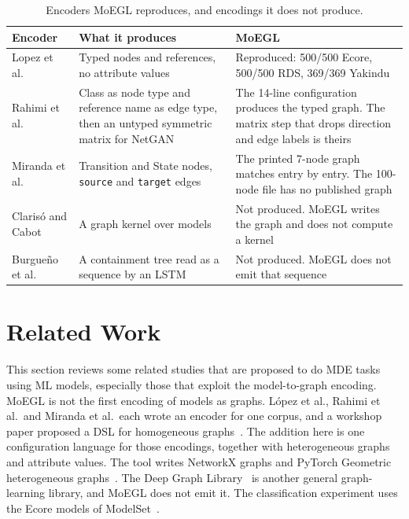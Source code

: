 \documentclass[journal,article,submit,moreauthors,technologies]{Definitions/mdpi}
\newcommand{\rev}[1]{#1}
\begin{document}
\begin{table}[H]
\caption{\rev{Encoders MoEGL reproduces, and encodings it does not produce.}\label{tab:coverage}}
\centering
\small
\begin{tabularx}{\textwidth}{lXX}
\toprule
\textbf{Encoder} & \textbf{What it produces} & \textbf{MoEGL} \\
\midrule
\rev{Lopez et al.~\cite{lopez2022generating}} & \rev{Typed nodes and references, no attribute values} & \rev{Reproduced: 500/500 Ecore, 500/500 RDS, 369/369 Yakindu} \\
\rev{Rahimi et al.~\cite{rahimi2023towards}} & \rev{Class as node type and reference name as edge type, then an untyped symmetric matrix for NetGAN} & \rev{The 14-line configuration produces the typed graph. The matrix step that drops direction and edge labels is theirs} \\
\rev{Miranda et al.~\cite{miranda2024towards}} & \rev{Transition and State nodes, \texttt{source} and \texttt{target} edges} & \rev{The printed 7-node graph matches entry by entry. The 100-node file has no published graph} \\
\rev{Claris\'o and Cabot~\cite{clariso2018applying}} & \rev{A graph kernel over models} & \rev{Not produced. MoEGL writes the graph and does not compute a kernel} \\
\rev{Burgue\~no et al.~\cite{burgueno2019lstm}} & \rev{A containment tree read as a sequence by an LSTM} & \rev{Not produced. MoEGL does not emit that sequence} \\
\bottomrule
\end{tabularx}
\end{table}

\section{Related Work} \label{Sec:relatedwork}
This section reviews some related studies that are proposed to do MDE tasks using ML models, especially those that exploit the model-to-graph encoding. \rev{MoEGL is not the first encoding of models as graphs. L\'opez et al., Rahimi et al.\ and Miranda et al.\ each wrote an encoder for one corpus, and a workshop paper proposed a DSL for homogeneous graphs~\cite{rajaei2021dsl}. The addition here is one configuration language for those encodings, together with heterogeneous graphs and attribute values. The tool writes NetworkX graphs and PyTorch Geometric heterogeneous graphs~\cite{fey2019fast}. The Deep Graph Library~\cite{wang2019deep} is another general graph-learning library, and MoEGL does not emit it. The classification experiment uses the Ecore models of ModelSet~\cite{lopez2022modelset}.}
\end{document}
